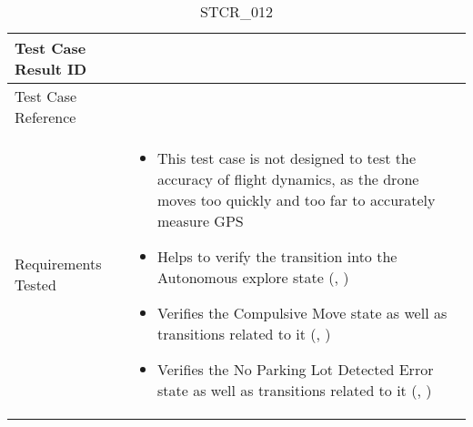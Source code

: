 \documentclass[12pt, titlepage]{article}
\begin{document}
\begin{table}[!h]
\begin{center}
\caption {STCR\_012}
\label{tab:STCR_012}
\begin{tabular}{ | m{3.2cm} | m{12.2cm} | } 
\hline
Test Case Result ID & \nameref{tab:STCR_012} \\ 
\hline
Test Case Reference & \nameref{tab:STC_012}  \\ 
\hline
Requirements Tested & 
\begin{itemize}
    \item This test case is not designed to test the accuracy of flight dynamics, as the drone moves too quickly and too far to accurately measure GPS
    \item Helps to verify the transition into the Autonomous explore state (\nameref{STA_003}, \nameref{TRANS_004})
    \item Verifies the Compulsive Move state as well as transitions related to it (\nameref{STA_011}, \nameref{TRANS_012})
    \item Verifies the No Parking Lot Detected Error state as well as transitions related to it (\nameref{STA_008}, \nameref{TRANS_008})
    
\end{itemize}
\\ 


\end{tabular}
\end{center}
\end{table}
\end{document}
